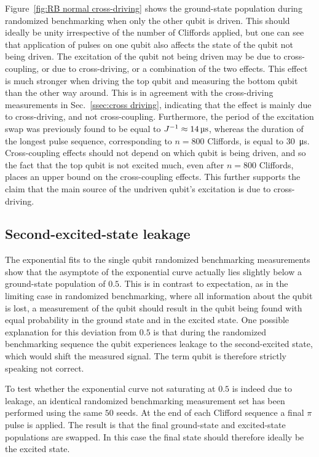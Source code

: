         Figure~\ref{fig:RB normal cross-driving} shows the ground-state population during randomized benchmarking when only the other qubit is driven. This should ideally be unity irrespective of the number of Cliffords applied, but one can see that application of pulses on one qubit also affects the state of the qubit not being driven. The excitation of the qubit not being driven may be due to cross-coupling, or due to cross-driving, or a combination of the two effects. This effect is much stronger when driving the top qubit and measuring the bottom qubit than the other way around. This is in agreement with the cross-driving measurements in Sec.~\ref{ssec:cross driving}, indicating that the effect is mainly due to cross-driving, and not cross-coupling. Furthermore, the period of the excitation swap was previously found to be equal to $J^{-1} \approx \text{\ensuremath{\SI{14}{\micro \second}}}$, whereas the duration of the longest pulse sequence, corresponding to $n=800$ Cliffords, is equal to \SI{30}{\micro \second}. Cross-coupling effects should not depend on which qubit is being driven, and so the fact that the top qubit is not excited much, even after $n=800$ Cliffords, places an upper bound on the cross-coupling effects. This further supports the claim that the main source of the undriven qubit's excitation is due to cross-driving.

      \subsection{Second-excited-state leakage}
        \label{ssec:Second-excited-state leakage}
        The exponential fits to the single qubit randomized benchmarking measurements show that the asymptote of the exponential curve actually lies slightly below a ground-state population of $0.5$. This is in contrast to expectation, as in the limiting case in randomized benchmarking, where all information about the qubit is lost, a measurement of the qubit should result in the qubit being found with equal probability in the ground state and in the excited state. One possible explanation for this deviation from $0.5$ is that during the randomized benchmarking sequence the qubit experiences leakage to the second-excited state, which would shift the measured signal. The term qubit is therefore strictly speaking not correct.

        To test whether the exponential curve not saturating at $0.5$ is indeed due to leakage, an identical randomized benchmarking measurement set has been performed using the same $50$ seeds. At the end of each Clifford sequence a final $\pi$ pulse is applied. The result is that the final ground-state and excited-state populations are swapped. In this case the final state should therefore ideally be the excited state.

